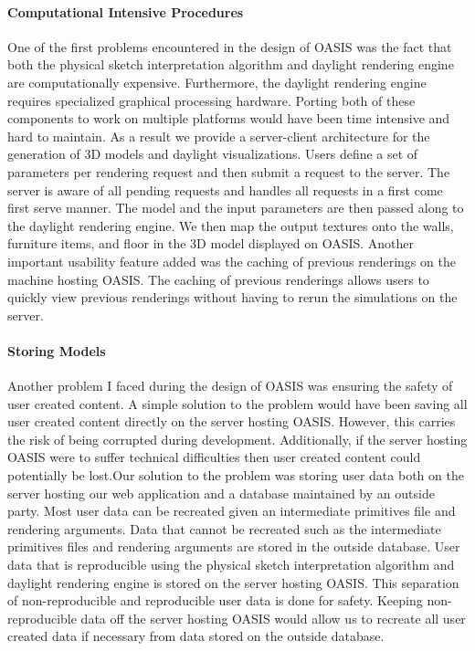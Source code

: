 \paragraph{Computational Intensive Procedures}
One of the first problems encountered in the design of OASIS was the fact that both the physical sketch interpretation algorithm and daylight rendering engine are computationally expensive. Furthermore, the daylight rendering engine requires specialized graphical processing hardware. Porting both of these components to work on multiple platforms would have been time intensive and hard to maintain. As a result we provide a server-client architecture for the generation of 3D models and daylight visualizations. Users define a set of parameters per rendering request and then submit a request to the server. The server is aware of all pending requests and handles all requests in a first come first serve manner. The model and the input parameters are then passed along to the daylight rendering engine. We then map the output  textures onto the walls, furniture items, and floor in the 3D model displayed on OASIS. Another important usability feature added was the caching of previous renderings on the machine hosting OASIS. The caching of previous renderings allows users to quickly view previous renderings without having to rerun the simulations on the server.	\\
 
\paragraph{Storing Models}
Another problem I faced during the design of OASIS was ensuring the safety of user created content.  A simple solution to the problem would have been saving all user created content directly on the server hosting OASIS.  However, this carries the risk of being corrupted during development. Additionally, if the server hosting OASIS were to suffer technical difficulties then user created content could potentially be lost.Our solution to the problem was storing user data both on the server hosting our web application and a database maintained by an outside party.  Most user data can be recreated given an intermediate primitives file and rendering arguments. Data that cannot be recreated such as the intermediate primitives files and rendering arguments are stored in the outside database.  User data that is reproducible using the physical sketch interpretation algorithm and daylight rendering engine is stored on the server hosting OASIS. This separation of non-reproducible and reproducible user data is done for safety. Keeping non-reproducible data off the server hosting OASIS would allow us to recreate all user created data if necessary from data stored on the outside database.  \\

